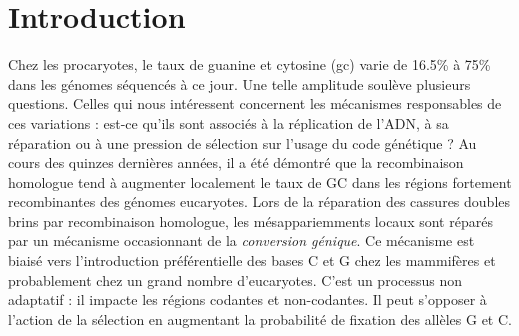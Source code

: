 
\newpage



\section*{Introduction}
\label{sec:introduction}


Chez les procaryotes, le taux de guanine et cytosine (\ac{gc}) varie de 16.5\% à
75\% dans les génomes séquencés à ce jour. Une telle amplitude soulève plusieurs
questions. Celles qui nous intéressent concernent les mécanismes responsables de
ces variations : est-ce qu'ils sont associés à la réplication de l'ADN, à sa
réparation ou à une pression de sélection sur l'usage du code génétique ? Au
cours des quinzes dernières années, il a été démontré que la recombinaison
homologue tend à augmenter localement le taux de GC dans les régions fortement
recombinantes des génomes
eucaryotes\cite{duret_biased_2009,lesecque_gc-biased_2013,williams_non-crossover_2015}.
Lors de la réparation des cassures doubles brins par recombinaison homologue,
les mésappariemments locaux sont réparés par un mécanisme occasionnant de la
\emph{conversion génique}\cite{chen_gene_2007}. Ce mécanisme est biaisé vers
l'introduction préférentielle des bases C et G chez les mammifères et
probablement chez un grand nombre d'eucaryotes\cite{pessia_evidence_2012}. C'est
un processus non adaptatif : il impacte les régions codantes et non-codantes. Il
peut s'opposer à l'action de la sélection en augmentant la probabilité de
fixation des allèles G et C\cite{ratnakumar_detecting_2010}.

